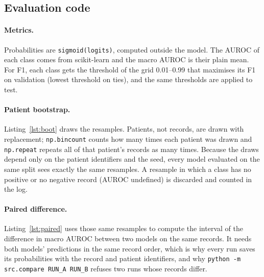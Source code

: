 


\subsection{Evaluation code}

\paragraph{Metrics.} Probabilities are \texttt{sigmoid(logits)}, computed outside the model. The AUROC of
each class comes from scikit-learn and the macro AUROC is their plain mean. For F1, each class gets the
threshold of the grid 0.01--0.99 that maximises its F1 on validation (lowest threshold on ties), and the
same thresholds are applied to test.

\paragraph{Patient bootstrap.} Listing~\ref{lst:boot} draws the resamples. Patients, not records, are drawn
with replacement; \texttt{np.bincount} counts how many times each patient was drawn and \texttt{np.repeat}
repeats all of that patient's records as many times. Because the draws depend only on the patient
identifiers and the seed, every model evaluated on the same split sees exactly the same resamples. A
resample in which a class has no positive or no negative record (AUROC undefined) is discarded and counted
in the log.



\paragraph{Paired difference.} Listing~\ref{lst:paired} uses those same resamples to compute the interval of
the difference in macro AUROC between two models on the same records. It needs both models' predictions in
the same record order, which is why every run saves its probabilities with the record and patient
identifiers, and why \texttt{python -m src.compare RUN\_A RUN\_B} refuses two runs whose records differ.



